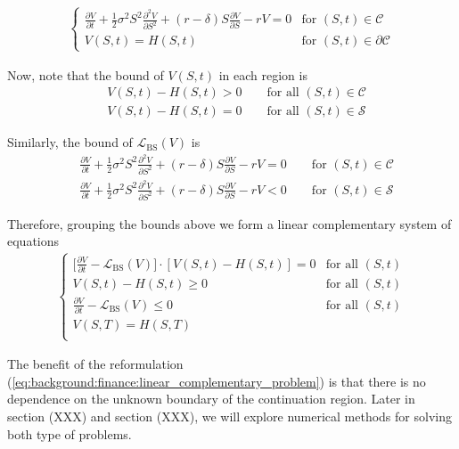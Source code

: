 \begin{align}
  \begin{cases}
  \frac{\partial{V}}{\partial{t}} + \frac{1}{2}\sigma^{2} S^2 \frac{\partial^2{V}}{\partial{S^2}} + (r - \delta)S \frac{\partial{V}}{\partial{S}} - rV = 0 & \text{for $(S, t) \in \mathcal{C}$} \\
  V(S, t) = H(S, t) & \text{for $(S,t)\in \partial\mathcal{C}$}
  \end{cases}
  \label{eq:background:finance:american_options_pde_free_boundary_problem}
\end{align}

Now, note that the bound of $V(S, t)$ in each region is
\begin{align*}
  &V(S, t) - H(S, t) > 0 \qquad \text{for all $(S,t) \in \mathcal{C}$} \\ 
  &V(S, t) - H(S, t) = 0 \qquad \text{for all $(S,t) \in \mathcal{S}$}
\end{align*}

Similarly, the bound of $\mathcal{L}_{\text{BS}}(V)$ is
\begin{align*}
  &\frac{\partial{V}}{\partial{t}} + \frac{1}{2}\sigma^{2} S^2 \frac{\partial^2{V}}{\partial{S^2}} + (r - \delta)S \frac{\partial{V}}{\partial{S}} - rV = 0 \qquad \text{for $(S,t) \in \mathcal{C}$} \\
  &\frac{\partial{V}}{\partial{t}} + \frac{1}{2}\sigma^{2} S^2 \frac{\partial^2{V}}{\partial{S^2}} + (r - \delta)S \frac{\partial{V}}{\partial{S}} - rV < 0 \qquad \text{for $(S,t) \in \mathcal{S}$}
\end{align*}

Therefore, grouping the bounds above we form a linear complementary system of equations
{
  \color{red}  
  \begin{align}
    \begin{cases}
      \big[\frac{\partial V}{\partial t} - \mathcal{L}_{\text{BS}}(V)\big] \cdot [V(S,t) - H(S,t)] = 0 & \text{for all $(S,t)$} \\
      V(S, t) - H(S, t) \ge 0 & \text{for all $(S, t)$}\\
      \frac{\partial V}{\partial t} - \mathcal{L}_{\text{BS}}(V) \le 0 &  \text{for all $(S, t)$}\\
      V(S, T) = H(S, T) \\  
    \end{cases}
    \label{eq:background:finance:linear_complementary_problem}
  \end{align}
}

The benefit of the reformulation (\ref*{eq:background:finance:linear_complementary_problem})
is that there is no dependence on the unknown boundary of the continuation region.
Later in section (XXX) and section (XXX), we will explore numerical methods for solving 
both type of problems.

